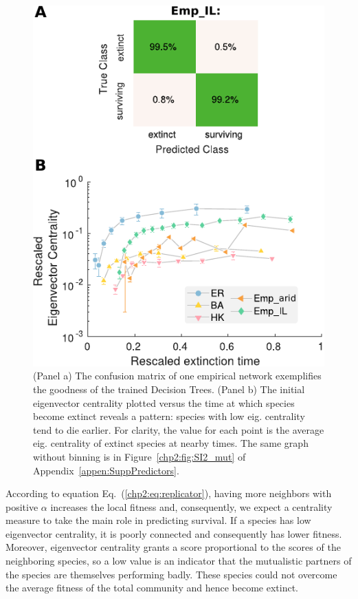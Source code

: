 \begin{figure}[t]
    \centering
    \includegraphics{figures/chp2/fig_6.pdf}
    \caption[Confusion matrix and time evolution of the eigenvector centrality in mutualistic communities]{(Panel a) The confusion matrix of one empirical network exemplifies the goodness of the trained Decision Trees. (Panel b) The initial eigenvector centrality plotted versus the time at which species become extinct reveals a pattern: species with low eig. centrality tend to die earlier. For clarity, the value for each point is the average eig. centrality of extinct species at nearby times. The same graph without binning is in Figure~\ref{chp2:fig:SI2_mut} of Appendix~\ref{appen:SuppPredictors}.}
    \label{chp2:fig:6}
\end{figure}

According to equation Eq.~(\ref{chp2:eq:replicator}), having more neighbors with positive $\alpha$ increases the local fitness and, consequently, we expect a centrality measure to take the main role in predicting survival. If a species has low eigenvector centrality, it is poorly connected and consequently has lower fitness. Moreover, eigenvector centrality grants a score proportional to the scores of the neighboring species, so a low value is an indicator that the mutualistic partners of the species are themselves performing badly. These species could not overcome the average fitness of the total community and hence become extinct. \\

